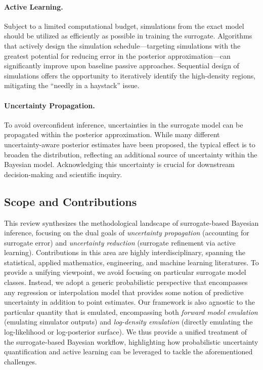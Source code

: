 \documentclass[12pt]{article}
\begin{document}
\paragraph{Active Learning.} 
Subject to a limited computational budget, simulations from the exact
model should be utilized as efficiently as possible in training the surrogate. Algorithms that 
actively design the simulation schedule---targeting simulations with the greatest potential for reducing
error in the posterior approximation---can significantly improve upon baseline passive approaches.
Sequential design of simulations offers the opportunity to iteratively identify the high-density regions,
mitigating the ``needly in a haystack'' issue.

\paragraph{Uncertainty Propagation.}
To avoid overconfident inference, uncertainties in the surrogate model can be propagated within the
posterior approximation. While many different uncertainty-aware posterior estimates have been
proposed, the typical effect is to broaden the distribution, reflecting an additional source of uncertainty
within the Bayesian model. Acknowledging this uncertainty is crucial for downstream decision-making
and scientific inquiry.


\subsection{Scope and Contributions}
This review synthesizes the methodological landscape of surrogate-based Bayesian inference, 
focusing on the dual goals of \textit{uncertainty propagation} (accounting for surrogate error) and 
\textit{uncertainty reduction} (surrogate refinement via active learning). Contributions in this 
area are highly interdisciplinary, spanning the statistical, applied mathematics, engineering, and 
machine learning literatures. To provide a unifying viewpoint, we avoid focusing on particular 
surrogate model classes. Instead, we adopt a generic probabilistic perspective that encompasses any 
regression or interpolation model that provides some notion of predictive uncertainty in addition 
to point estimates. Our framework is also agnostic to the particular quantity that is emulated,
encompassing both \textit{forward model emulation} (emulating simulator outputs) and 
\textit{log-density emulation} (directly emulating the log-likelihood or log-posterior surface).
We thus provide a unified treatment of the surrogate-based Bayesian workflow, highlighting 
how probabilistic uncertainty quantification and active learning can be leveraged to 
tackle the aforementioned challenges.
\end{document}
